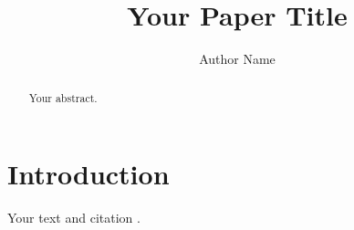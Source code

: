 \documentclass[11pt]{article}
\theoremstyle{definition}
\theoremstyle{remark}
\begin{document}
\title{Your Paper Title}
\author{Author Name}
\date{}
\maketitle

\begin{abstract}
Your abstract.
\end{abstract}

\section{Introduction}
Your text and citation \cite{example2024}.



\end{document}
